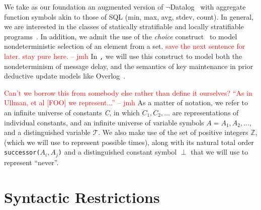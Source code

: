 \documentclass{acm_proc_article-sp-sigmod09}
\newcommand{\Tau}{\mathcal{T}}
\newcommand{\jmh}[1]{{\textcolor{red}{#1 -- jmh}}}
\newcommand{\dedalus}[1]{\texttt{\fontsize{9pt}{9pt}\selectfont #1}}
\begin{document}
We take as our foundation 
an augmented version of \linebreak
$\lnot$Datalog~\cite{ullmanbook} with aggregate function
symbols akin to those of SQL (min, max, avg, stdev, count).  In general, we are interested in the classes of statically
stratifiable and locally stratifiable programs~\cite{prz}.  In addition, we admit the
use of the \emph{choice} construct~\cite{greedychoice, eventchoice} to model
nondeterministic selection of an element from a set.  
\jmh{save the next sentence for later.  stay pure here.}
In \dedalus, we will use this construct to
model both the nondeterminism of message delay, and the semantics of key
maintenance in prior deductive update models like Overlog~\cite{boon}.

\jmh{Can't we borrow this from somebody else rather than define it ourselves?  ``As in Ullman, et al [FOO] we represent...''}
As a matter of notation, we refer to an infinite universe of constants \emph{C}, in which
$C_{1}, C_{2}, \ldots$ are representations of individual constants, and
an infinite universe of variable symbols $A = A_1, A_2, \ldots$, and a distinguished variable $\Tau$.
We also make use of the set of positive integers $\mathbb{Z}$,
(which we will use to represent possible times), along with its natural total order
\dedalus{successor($A_i, A_j$)} and a distinguished constant symbol $\perp$ that we will use to represent ``never''.

\section{Syntactic Restrictions}

\end{document}
